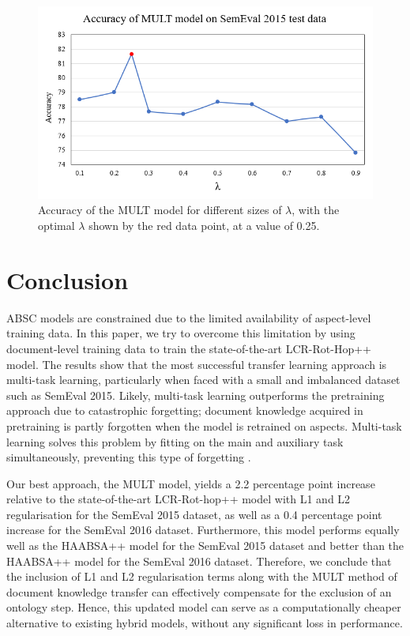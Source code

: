 \documentclass[runningheads]{llncs}
\begin{document}
\begin{figure}
    \centering
    \includegraphics[scale=0.85]{Images/mult.PNG}
    \caption{Accuracy of the MULT model for different sizes of $\lambda$, with the optimal $\lambda$ shown by the red data point, at a value of 0.25.}
    \label{fig:multLambda}
\end{figure}

\section{Conclusion}

ABSC models are constrained due to the limited availability of aspect-level training data. In this paper, we try to overcome this limitation by using document-level training data to train the state-of-the-art LCR-Rot-Hop++ model. The results show that the most successful transfer learning approach is multi-task learning, particularly when faced with a small and imbalanced dataset such as SemEval 2015. Likely, multi-task learning outperforms the pretraining approach due to catastrophic forgetting; document knowledge acquired in pretraining is partly forgotten when the model is retrained on aspects. Multi-task learning solves this problem by fitting on the main and auxiliary task simultaneously, preventing this type of forgetting \cite{Chen2020}. 

Our best approach, the MULT model, yields a 2.2 percentage point increase relative to the state-of-the-art LCR-Rot-hop++ model with L1 and L2 regularisation for the SemEval 2015 dataset, as well as a 0.4 percentage point increase for the SemEval 2016 dataset. Furthermore, this model performs equally well as the HAABSA++ model for the SemEval 2015 dataset and better than the HAABSA++ model for the SemEval 2016 dataset. Therefore, we conclude that the inclusion of L1 and L2 regularisation terms along with the MULT method of document knowledge transfer can effectively compensate for the exclusion of an ontology step. Hence, this updated model can serve as a computationally cheaper alternative to existing hybrid models, without any significant loss in performance.
\end{document}
